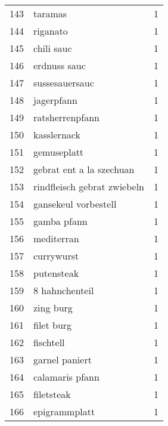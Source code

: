 \begin{tabular}{llr}
143 &                                            taramas &      1 \\
144 &                                           riganato &      1 \\
145 &                                         chili sauc &      1 \\
146 &                                       erdnuss sauc &      1 \\
147 &                                     sussesauersauc &      1 \\
148 &                                         jagerpfann &      1 \\
149 &                                    ratsherrenpfann &      1 \\
150 &                                        kasslernack &      1 \\
151 &                                        gemuseplatt &      1 \\
152 &                           gebrat ent a la szechuan &      1 \\
153 &                        rindfleisch gebrat zwiebeln &      1 \\
154 &                               gansekeul vorbestell &      1 \\
155 &                                        gamba pfann &      1 \\
156 &                                         mediterran &      1 \\
157 &                                         currywurst &      1 \\
158 &                                         putensteak &      1 \\
159 &                                     8 hahnchenteil &      1 \\
160 &                                          zing burg &      1 \\
161 &                                         filet burg &      1 \\
162 &                                          fischtell &      1 \\
163 &                                     garnel paniert &      1 \\
164 &                                    calamaris pfann &      1 \\
165 &                                         filetsteak &      1 \\
166 &                                      epigrammplatt &      1 \\

\end{tabular}
